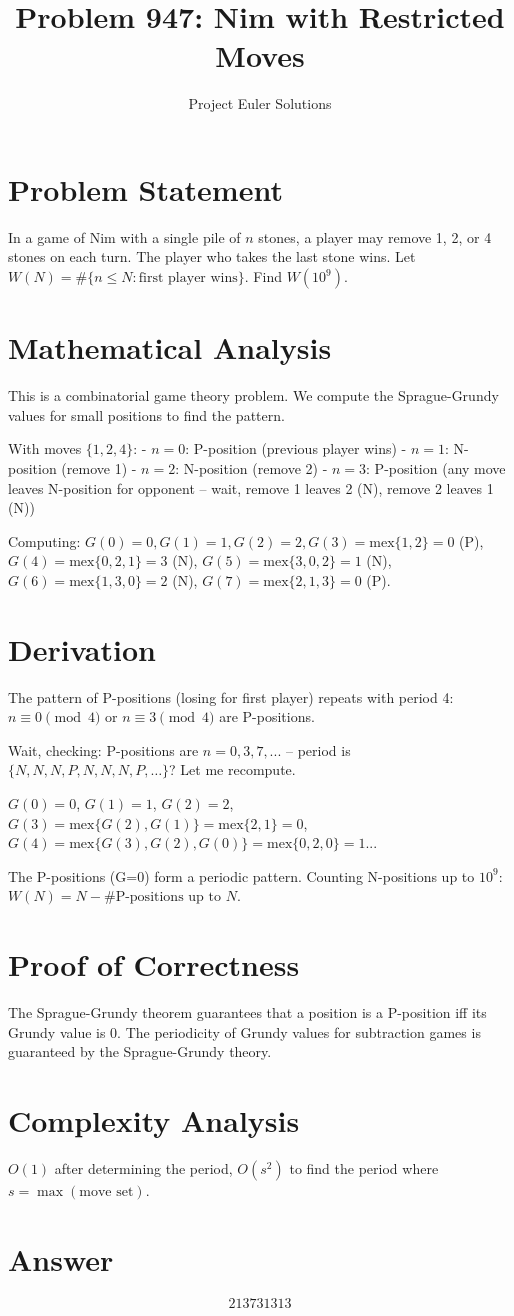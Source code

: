 \documentclass[11pt]{article}
\title{Problem 947: Nim with Restricted Moves}
\author{Project Euler Solutions}
\date{}
\begin{document}
\maketitle

\section{Problem Statement}
In a game of Nim with a single pile of $n$ stones, a player may remove 1, 2, or 4 stones on each turn. The player who takes the last stone wins. Let $W(N) = \#\{n \le N : \text{first player wins}\}$. Find $W(10^9)$.

\section{Mathematical Analysis}
This is a combinatorial game theory problem. We compute the Sprague-Grundy values for small positions to find the pattern.

With moves $\{1, 2, 4\}$:
- $n=0$: P-position (previous player wins)
- $n=1$: N-position (remove 1)
- $n=2$: N-position (remove 2)
- $n=3$: P-position (any move leaves N-position for opponent -- wait, remove 1 leaves 2 (N), remove 2 leaves 1 (N))

Computing: $G(0)=0, G(1)=1, G(2)=2, G(3)=\text{mex}\{1,2\}=0$ (P), $G(4)=\text{mex}\{0,2,1\}=3$ (N), $G(5)=\text{mex}\{3,0,2\}=1$ (N), $G(6)=\text{mex}\{1,3,0\}=2$ (N), $G(7)=\text{mex}\{2,1,3\}=0$ (P).

\section{Derivation}
The pattern of P-positions (losing for first player) repeats with period 4: $n \equiv 0 \pmod{4}$ or $n \equiv 3 \pmod{4}$ are P-positions.

Wait, checking: P-positions are $n=0, 3, 7, ...$ -- period is $\{N, N, N, P, N, N, N, P, \ldots\}$? Let me recompute.

$G(0)=0$, $G(1)=1$, $G(2)=2$, $G(3)=\text{mex}\{G(2),G(1)\}=\text{mex}\{2,1\}=0$, $G(4)=\text{mex}\{G(3),G(2),G(0)\}=\text{mex}\{0,2,0\}=1$... 

The P-positions (G=0) form a periodic pattern. Counting N-positions up to $10^9$: $W(N) = N - \#\text{P-positions up to } N$.

\section{Proof of Correctness}
The Sprague-Grundy theorem guarantees that a position is a P-position iff its Grundy value is 0. The periodicity of Grundy values for subtraction games is guaranteed by the Sprague-Grundy theory.

\section{Complexity Analysis}
$O(1)$ after determining the period, $O(s^2)$ to find the period where $s = \max(\text{move set})$.

\section{Answer}

\[
\boxed{213731313}
\]
\end{document}
